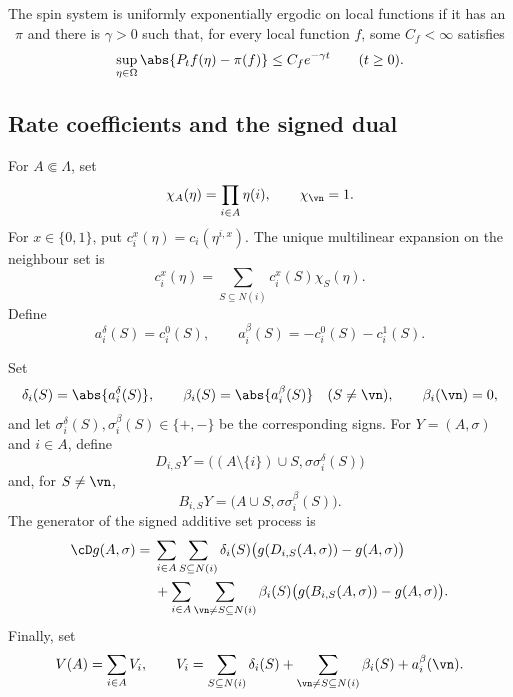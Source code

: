 \begin{definition}
\label{def:uniform-exponential-ergodicity}
The spin system is uniformly exponentially ergodic on local functions
if it has an \invariantmeasure\ \(\pi\) and there is \(\gamma>0\) such
that, for every local function \(f\), some \(C_f<\infty\) satisfies
\[
  \sup_{\eta\in\Omega}
  \abs{P_tf(\eta)-\pi(f)}
  \le C_fe^{-\gamma t}
  \qquad(t\ge0).
\]
\end{definition}

\subsection{Rate coefficients and the signed dual}

\begin{notation}
\label{not:monomial-coefficients}
For \(A\Subset\Lambda\), set
\[
  \chi_A(\eta)=\prod_{i\in A}\eta(i),
  \qquad
  \chi_\vn=1.
\]
For \(x\in\{0,1\}\), put \(c_i^x(\eta)=c_i(\eta^{i,x})\).
The unique multilinear expansion on the neighbour set is
\begin{equation}
  c_i^x(\eta)
  =
  \sum_{S\subseteq N(i)}c_i^x(S)\chi_S(\eta).
  \label{eq:rate-expansion}
\end{equation}
Define
\begin{equation}
  a_i^\delta(S)=c_i^0(S),
  \qquad
  a_i^\beta(S)=-c_i^0(S)-c_i^1(S).
  \label{eq:signed-coefficients}
\end{equation}
\end{notation}

\begin{definition}
\label{def:signed-dual}
Set
\[
  \delta_i(S)=\abs{a_i^\delta(S)},
  \qquad
  \beta_i(S)=\abs{a_i^\beta(S)}
  \quad(S\ne\vn),
  \qquad
  \beta_i(\vn)=0,
\]
and let
\(\sigma_i^\delta(S),\sigma_i^\beta(S)\in\{+,-\}\) be the
corresponding signs. For \(Y=(A,\sigma)\) and \(i\in A\), define
\[
  D_{i,S}Y
  =
  \bigl((A\setminus\{i\})\cup S,
        \sigma\sigma_i^\delta(S)\bigr)
\]
and, for \(S\ne\vn\),
\[
  B_{i,S}Y
  =
  \bigl(A\cup S,\sigma\sigma_i^\beta(S)\bigr).
\]
The generator of the signed additive set process is
\begin{align}
  \cD g(A,\sigma)
  ={}&
  \sum_{i\in A}\sum_{S\subseteq N(i)}
  \delta_i(S)
  \bigl(g(D_{i,S}(A,\sigma))-g(A,\sigma)\bigr)
  \notag\\
  &+
  \sum_{i\in A}\sum_{\vn\ne S\subseteq N(i)}
  \beta_i(S)
  \bigl(g(B_{i,S}(A,\sigma))-g(A,\sigma)\bigr).
  \label{eq:dual-generator}
\end{align}
Finally, set
\begin{equation}
  V(A)=\sum_{i\in A}V_i,
  \qquad
  V_i
  =
  \sum_{S\subseteq N(i)}\delta_i(S)
  +
  \sum_{\vn\ne S\subseteq N(i)}\beta_i(S)
  +
  a_i^\beta(\vn).
  \label{eq:fk-potential}
\end{equation}
\end{definition}

